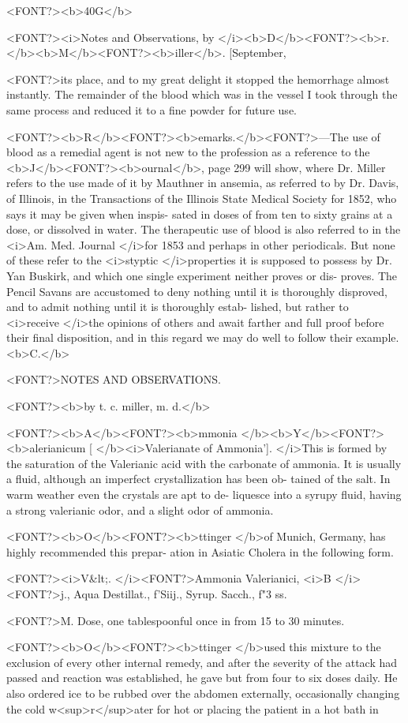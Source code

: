 <FONT?><b>40G</b>

<FONT?><i>Notes and Observations, by </i><b>D</b><FONT?><b>r. </b><b>M</b><FONT?><b>iller</b>. [September,

<FONT?>its place, and to my great delight it stopped the hemorrhage almost
instantly. The remainder of the blood which was in the vessel I took
through the same process and reduced it to a fine powder for future use.

<FONT?><b>R</b><FONT?><b>emarks.</b><FONT?>---The use of blood as a remedial agent is not new to the
profession as a reference to the <b>J</b><FONT?><b>ournal</b>, page 299 will show, where
Dr. Miller refers to the use made of it by Mauthner in ansemia, as
referred to by Dr. Davis, of Illinois, in the Transactions of the Illinois
State Medical Society for 1852, who says it may be given when inspis-
sated in doses of from ten to sixty grains at a dose, or dissolved in
water. The therapeutic use of blood is also referred to in the <i>Am.
Med. Journal </i>for 1853 and perhaps in other periodicals. But none of
these refer to the <i>styptic </i>properties it is supposed to possess by Dr.
Yan Buskirk, and which one single experiment neither proves or dis-
proves. The Pencil Savans are accustomed to deny nothing until it is
thoroughly disproved, and to admit nothing until it is thoroughly estab-
lished, but rather to <i>receive </i>the opinions of others and await farther
and full proof before their final disposition, and in this regard we may
do well to follow their example. <b>C.</b>

<FONT?>NOTES AND OBSERVATIONS.

<FONT?><b>by t. c. miller, m. d.</b>

<FONT?><b>A</b><FONT?><b>mmonia </b><b>Y</b><FONT?><b>alerianicum [ </b><i>Valerianate of Ammonia']. </i>This is formed
by the saturation of the Valerianic acid with the carbonate of ammonia.
It is usually a fluid, although an imperfect crystallization has been ob-
tained of the salt. In warm weather even the crystals are apt to de-
liquesce into a syrupy fluid, having a strong valerianic odor, and a
slight odor of ammonia.

<FONT?><b>O</b><FONT?><b>ttinger </b>of Munich, Germany, has highly recommended this prepar-
ation in Asiatic Cholera in the following form.

<FONT?><i>V&lt;.   </i><FONT?>Ammonia Valerianici, <i>B </i><FONT?>j.,
Aqua Destillat., f'Siij.,
Syrup. Sacch., f"3 ss.

<FONT?>M.   Dose, one tablespoonful once in from 15 to 30 minutes.

<FONT?><b>O</b><FONT?><b>ttinger </b>used this mixture to the exclusion of every other internal
remedy, and after the severity of the attack had passed and reaction
was established, he gave but from four to six doses daily. He also
ordered ice to be rubbed over the abdomen externally, occasionally
changing the cold w<sup>r</sup>ater for hot or placing the patient in a hot bath in\endinput
